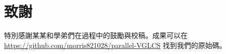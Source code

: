 \section*{致謝}

特別感謝某某和學弟們在過程中的鼓勵與校稿。成果可以在 \url{https://github.com/morris821028/parallel-VGLCS} 找到我們的原始碼。